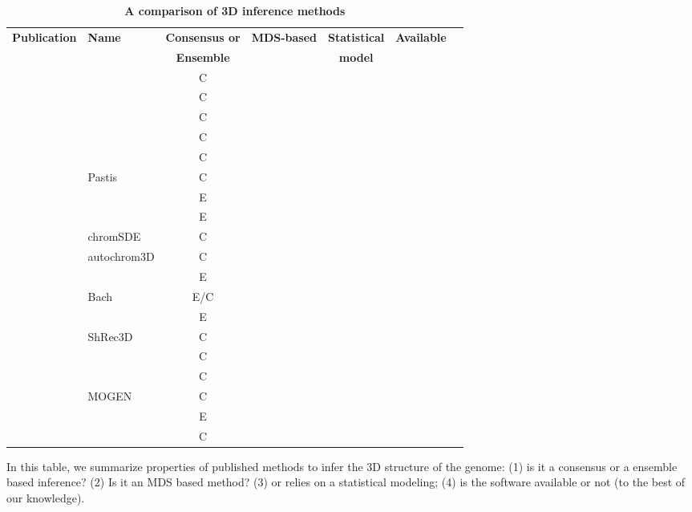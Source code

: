 \documentclass[letterpaper,12pt]{article}
\newcommand*\CHECK{\ding{51}}
\begin{document}
\begin{table}[ht!]
\begin{center}
\scriptsize
\begin{tabular}{rlccccc}
\hline
\multirow{2}{*}{\textbf{\footnotesize Publication}} & \multirow{2}{*}{\textbf{\footnotesize Name}} &
\textbf{\footnotesize Consensus or} 
&\multirow{2}{*}{\textbf{\footnotesize MDS-based}} & \textbf{\footnotesize Statistical} &
\multirow{2}{*}{\textbf{\footnotesize Available}} \\
& & \textbf{\footnotesize Ensemble}
 & & \textbf{\footnotesize model} & \\
\hline
\hline
\scriptsize{\cite{dekker:capturing}} & & C & \CHECK & & \\
\scriptsize{\cite{duan:three-dimensional}} &  & C & \CHECK & & \CHECK \\
\scriptsize{\cite{tanizawa:mapping}} & & C & \CHECK & & \\
\scriptsize{\cite{ay:three-dimensional}} & & C & \CHECK & & \\
\scriptsize{\cite{ben-elazar:spatial}} & & C & \CHECK & & \CHECK \\
\scriptsize{\cite{varoquaux:statistical}} & Pastis & C & & \CHECK & \CHECK\\
\scriptsize{\cite{bau:three-dimensional}} & & E & & &  \\
\scriptsize{\cite{umbarger:three-dimensional}} & & E  & & &\\
\scriptsize{\cite{zhang:inference}} & chromSDE & C &  \CHECK & & \CHECK\\
\scriptsize{\cite{peng:sequencing}} & autochrom3D & C &  \CHECK & & \CHECK\\
\scriptsize{\cite{rousseau:three}} & & E & & \CHECK & \CHECK\\
\scriptsize{\cite{hu:bayesian}} & Bach & E/C &  & \CHECK & \CHECK\\
\scriptsize{\cite{kalhor:genome}} & & E &   & &\\
\scriptsize{\cite{lesne:3d}} & ShRec3D & C  & \CHECK & & \CHECK \\
\scriptsize{\cite{trieu:large}} & & C & & & \\
\scriptsize{\cite{trieu:3D}} & & C & &  & \\
\scriptsize{\cite{trieu:MOGEN}} & MOGEN & C & & & \\
\scriptsize{\cite{nagano:single-cell}} & & E & & & \\
\scriptsize{\cite{paulsen:manifold}} & & C & \CHECK & & \CHECK \\
\hline
\end{tabular}
\end{center}
\caption{\bf A comparison of 3D inference methods}{\small In this table, we summarize
properties of published methods to infer the 3D structure of the genome: (1)
is it a consensus or a ensemble based inference? (2) Is it an MDS based
method? (3) or relies on a statistical modeling; (4) is the software
available or not (to the best of our knowledge).}
\end{table}
\end{document}
